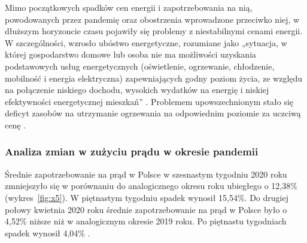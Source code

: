 \documentclass[polish, twoside, 12pt, a4paper]{article}
\theoremstyle{definition}
\theoremstyle{plain}
\theoremstyle{remark}
\begin{document}
Mimo początkowych spadków cen energii i zapotrzebowania na nią, powodowanych przez pandemię oraz obostrzenia wprowadzone przeciwko niej, w dłuższym horyzoncie czasu pojawiły się problemy z niestabilnymi cenami energii. W szczególności, wzrosło ubóstwo  energetyczne, rozumiane jako „sytuacja, w której gospodarstwo domowe lub osoba nie ma możliwości uzyskania podstawowych usług energetycznych (oświetlenie, ogrzewanie, chłodzenie, mobilność i energia elektryczna) zapewniających godny poziom życia, ze względu na połączenie niskiego dochodu, wysokich wydatków na energię i niskiej efektywności energetycznej  mieszkań” \parencite{gorska2023}. Problemem upowszechnionym stało się deficyt zasobów na utrzymanie ogrzewania na odpowiednim poziomie za uczciwą cenę \parencite{gorska2023}. 


\subsubsection{Analiza zmian w zużyciu prądu w okresie pandemii}

Średnie zapotrzebowanie na prąd w Polsce w szesnastym tygodniu 2020 roku zmniejszyło się w porównaniu do analogicznego okresu roku ubiegłego o 12,38\% (wykres~\ref{fig:x5}). W piętnastym tygodniu spadek wynosił 15,54\%. Do drugiej połowy kwietnia 2020 roku średnie zapotrzebowanie na prąd w Polsce było o 4,52\% niższe niż w analogicznym okresie 2019 roku. Po piętnastu tygodniach spadek wynosił 4,04\% \parencite{biuroanalizpfr2020}.
\end{document}
